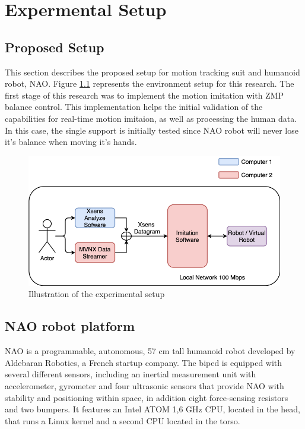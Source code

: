 \chapter{Expermental Setup}
\label{chapter-5}

\section{Proposed Setup}

This section describes the proposed setup for motion tracking suit and humanoid robot, NAO. Figure \ref{fig: experimental-setup} represents the environment setup for this research.
The first stage of this research was to implement the motion imitation with ZMP balance control. This implementation helps the initial validation of the capabilities for real-time motion imitaion, 
as well as processing the human data. In this case, the single support is initially tested since NAO robot will never lose it's balance when moving it's hands.

\begin{figure}[h!]
    \centering
    \includegraphics[scale=0.5]{images/flowchart-experimental-setup.png}\hfill
    \caption{Illustration of the experimental setup}\hfill
    \label{fig: experimental-setup}
\end{figure}

\section{NAO robot platform}


NAO is a programmable, autonomous, 57 cm tall humanoid robot developed by Aldebaran Robotics, a French startup company. The biped is equipped with several
different sensors, including an inertial measurement unit with accelerometer, gyrometer and four ultrasonic sensors that provide NAO with stability and 
positioning within space, in addition eight force-sensing resistors and two bumpers. It features an Intel ATOM 1,6 GHz CPU, located in the head, that runs
 a Linux kernel and a second CPU located in the torso.


